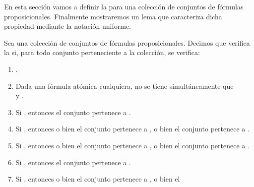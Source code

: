 \begin{isabellebody}
\begin{isamarkuptext}
\end{isamarkuptext}\isamarkuptrue%
%
\begin{isamarkuptext}%
En esta sección vamos a definir la  para una 
  colección de conjuntos de fórmulas proposicionales. Finalmente mostraremos un lema
  que caracteriza dicha propiedad mediante la notación uniforme.%
\end{isamarkuptext}\isamarkuptrue%
%
\begin{isamarkuptext}%
\begin{definicion}
    Sea  una colección de conjuntos de fórmulas proposicionales. Decimos que
     verifica la  si, para todo
    conjunto  perteneciente a la colección, se verifica:
    \begin{enumerate}
      \item {}.
      \item Dada  una fórmula atómica cualquiera, no se tiene 
        simultáneamente que\\  y .
      \item Si , entonces el conjunto  pertenece a .
      \item Si , entonces o bien el conjunto  pertenece a , o bien el 
        conjunto  pertenece a .
      \item Si , entonces o bien el conjunto  pertenece a , o bien el 
        conjunto  pertenece a .
      \item Si , entonces el conjunto  pertenece a .
      \item Si , entonces o bien el conjunto  pertenece a , o bien el 

\end{enumerate}
\end{definicion}
\end{isamarkuptext}
\end{isabellebody}
